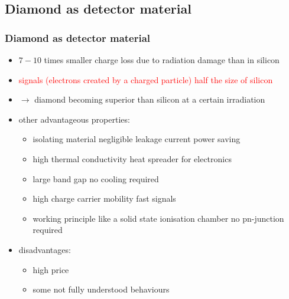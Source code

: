 \subsection{Diamond as detector material}
\begin{frame}
	\frametitle{Diamond as detector material}
	\begin{itemize}
		\setlength{\itemsep}{\fill}
		\item \textcolor{cadmiumgreen}{$7-10$ times smaller charge loss due to radiation damage than in silicon}
		\item \textcolor{red}{signals (electrons created by a charged particle) half the size of silicon}
		\item $\rightarrow$ diamond becoming superior than silicon at a certain irradiation
		\item other advantageous properties:
		\begin{itemize}
			\item isolating material \ra negligible leakage current \ra power saving 
			\item high thermal conductivity \ra heat spreader for electronics
			\item large band gap \ra no cooling required
			\item high charge carrier mobility \ra fast signals
			\item working principle like a solid state ionisation chamber \ra no pn-junction required
		\end{itemize}
		\item disadvantages:
		\begin{itemize}
			\item high price
			\item some not fully understood behaviours 
		\end{itemize}
	\end{itemize}
\end{frame}
